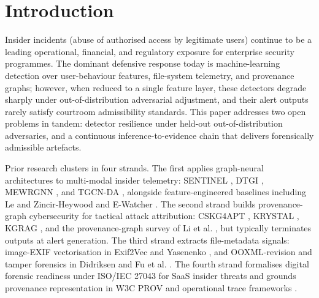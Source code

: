 \section{Introduction}
\label{sec:intro}

Insider incidents (abuse of authorised access by legitimate users) continue to be a leading operational, financial, and regulatory exposure for enterprise security programmes. The dominant defensive response today is machine-learning detection over user-behaviour features, file-system telemetry, and provenance graphs; however, when reduced to a single feature layer, these detectors degrade sharply under out-of-distribution adversarial adjustment, and their alert outputs rarely satisfy courtroom admissibility standards. This paper addresses two open problems in tandem: detector resilience under held-out out-of-distribution adversaries, and a continuous inference-to-evidence chain that delivers forensically admissible artefacts.

Prior research clusters in four strands. The first applies graph-neural architectures to multi-modal insider telemetry: SENTINEL \citep{xiao2024sentinel}, DTGI \citep{gao2023dtgi}, MEWRGNN \citep{xiao2022robust}, and TGCN-DA \citep{li2023tgcnda}, alongside feature-engineered baselines including Le and Zincir-Heywood \citep{le2020analyzing} and E-Watcher \citep{wei2024ewatcher}. The second strand builds provenance-graph cybersecurity for tactical attack attribution: CSKG4APT \citep{ren2022cskg4apt}, KRYSTAL \citep{kurniawan2022krystal}, KGRAG \citep{aki2025provenance}, and the provenance-graph survey of Li et al. \citep{li2021threat}, but typically terminates outputs at alert generation. The third strand extracts file-metadata signals: image-EXIF vectorisation in Exif2Vec \citep{umair2024exif2vec} and Yasenenko \citep{yasenenko2025evaluating}, and OOXML-revision and tamper forensics in Didriksen \citep{didriksen2014ooxml} and Fu et al. \citep{fu2015docx}. The fourth strand formalises digital forensic readiness under ISO/IEC 27043 for SaaS insider threats \citep{shoderu2025dfrsaas, shoderu2026dfrconference} and grounds provenance representation in W3C PROV \citep{yusof2025provcon, sikos2020provenance} and operational trace frameworks \citep{garfinkel2013detecting}.

